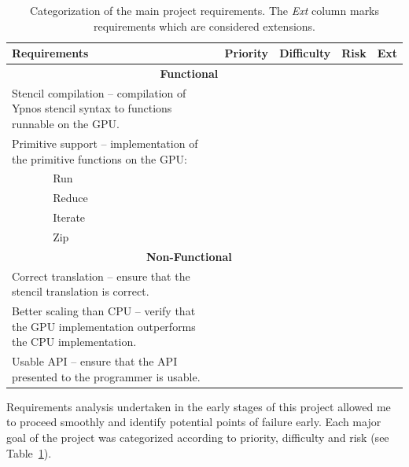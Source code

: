 \documentclass[
    12pt,
    a4paper,
    twoside,
    openright,
    ]{scrbook}
\begin{document}
\newcommand{\low}{\ding{108}}
\newcommand{\medium}{\low\low}
\newcommand{\high}{\low\medium}

\newcommand{\mc}[1]{\multicolumn{2}{p{8cm}|}{#1}}
\newcommand{\stripe}[1]{\hline\multicolumn{5}{c}{#1}\\\hline}
\newcommand{\tblheaders}[1]{#1\\ \hline}
\newcommand{\tick}{\ding{52}}

\begin{table}[h]
\centering
\caption{Categorization of the main project requirements. The \emph{Ext} column marks requirements which are considered extensions.\label{tbl:reqanal}}
\begin{tabular}{l l|l|l|l|l}
  \tblheaders{\mc{\textbf{Requirements}} & \textbf{Priority} & \textbf{Difficulty} & \textbf{Risk} & \textbf{Ext}}

  \stripe{\textbf{Functional}}

  \mc{Stencil compilation -- compilation of Ypnos stencil syntax to functions runnable on the GPU.} & \high & \high & \medium &  \\

  \mc{Primitive support -- implementation of the primitive functions on the GPU:} & & & \\
  & Run & \high & \medium & \medium &  \\
  & Reduce & \high & \medium & \medium & \\
  & Iterate & \low & \low & \low & \tick \\
  & Zip & \low & \high & \low & \tick \\

  \stripe{\textbf{Non-Functional}}

  \mc{Correct translation -- ensure that the stencil translation is correct.} & \high & \medium & \high & \\

  \mc{Better scaling than CPU -- verify that the GPU implementation outperforms the CPU implementation.} & \high & \medium & \medium & \\

  \mc{Usable API -- ensure that the API presented to the programmer is usable.} & \medium & \medium & \medium & \tick \\

\end{tabular}
\end{table}

Requirements analysis undertaken in the early stages of this project allowed me
to proceed smoothly and identify potential points of failure early. Each major
goal of the project was categorized according to priority, difficulty and risk
(see Table~\ref{tbl:reqanal}).
\end{document}
